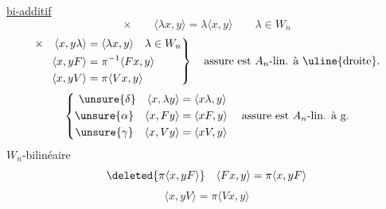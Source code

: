 \uline{bi-additif}
\[
\times\qquad\langle\lambda x,y\rangle=\lambda\langle x,y\rangle\qquad\lambda\in W_n
\]
\[
\left.\begin{aligned}
\times\quad\langle x,y\lambda\rangle&=\langle\lambda x,y\rangle\quad\lambda\in W_n\\
\langle x,yF\rangle&=\pi^{-1}\langle Fx,y\rangle\\
\langle x,yV\rangle&=\pi\langle Vx,y\rangle
\end{aligned}\right\}\quad\text{assure est }A_n\text{-lin. à \uline{droite}.}
\]
\[
\left\{\begin{aligned}
\unsure{\delta}\quad\langle x,\lambda y\rangle&=\langle x\lambda,y\rangle\\
\unsure{\alpha}\quad\langle x,Fy\rangle&=\langle xF,y\rangle\\
\unsure{\gamma}\quad\langle x,Vy\rangle&=\langle xV,y\rangle
\end{aligned}\right.\quad\text{assure est }A_n\text{-lin. à g.}
\]
\quad{}\quad{}
$W_n$-bilinéaire
\[
\deleted{\pi\langle x,yF\rangle}\quad\langle Fx,y\rangle=\pi\langle x,yF\rangle
\]
\[
\langle x,yV\rangle=\pi\langle Vx,y\rangle
\]

